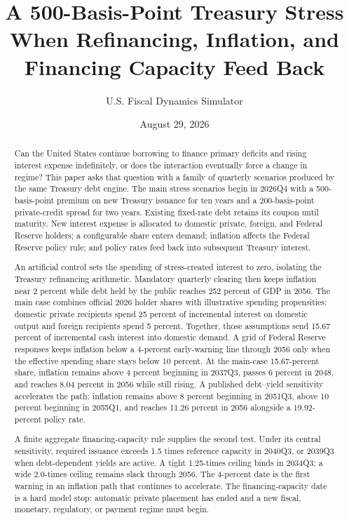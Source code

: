 \documentclass[11pt]{article}
\title{A 500-Basis-Point Treasury Stress\\
\large When Refinancing, Inflation, and Financing Capacity Feed Back}
\author{U.S. Fiscal Dynamics Simulator}
\date{August 29, 2026}
\begin{document}
\maketitle

\begin{abstract}
Can the United States continue borrowing to finance primary deficits and rising interest
expense indefinitely, or does the interaction eventually force a change in regime?  This
paper asks that question with a family of quarterly scenarios produced by the same Treasury
debt engine.  The main stress scenarios begin in 2026Q4 with a 500-basis-point premium on new
Treasury issuance for ten years and a 200-basis-point private-credit spread for two years.
Existing fixed-rate debt
retains its coupon until maturity.  New interest expense is allocated to domestic private,
foreign, and Federal Reserve holders; a configurable share enters demand; inflation affects
the Federal Reserve policy rule; and policy rates feed back into subsequent Treasury
interest.

An artificial control sets the spending of stress-created interest to zero, isolating the
Treasury refinancing arithmetic.  Mandatory quarterly clearing then keeps inflation near 2
percent while debt held by the public reaches 252 percent of GDP in 2056.  The main case
combines official 2026 holder shares with illustrative spending propensities: domestic private
recipients spend 25 percent of incremental interest on domestic output and foreign recipients
spend 5 percent.  Together, those assumptions send 15.67 percent of incremental cash interest
into domestic demand.  A grid of Federal Reserve responses keeps inflation below a
4-percent early-warning line through 2056 only when the effective spending share stays below
10 percent.  At the main-case 15.67-percent share, inflation remains above 4 percent beginning
in 2037Q3, passes 6 percent in 2048, and reaches 8.04 percent in 2056 while still rising.  A
published debt--yield sensitivity accelerates the path: inflation remains above 8 percent
beginning in 2051Q3, above 10 percent beginning in 2055Q1, and reaches 11.26 percent in 2056
alongside a 19.92-percent policy rate.

A finite aggregate financing-capacity rule supplies the second test.  Under its central
sensitivity, required issuance exceeds 1.5 times reference capacity in 2040Q3, or 2039Q3
when debt-dependent yields are active.  A tight 1.25-times ceiling binds in 2034Q3; a wide
2.0-times ceiling remains slack through 2056.  The 4-percent date is the first warning in an
inflation path that continues to accelerate.  The financing-capacity date is a hard model
stop: automatic private placement has ended and a new fiscal, monetary, regulatory, or
payment regime must begin.


\end{abstract}
\end{document}
